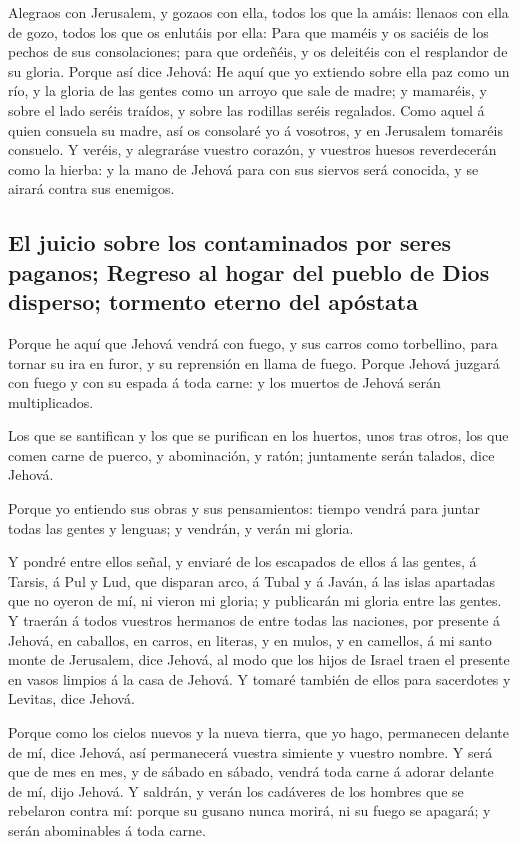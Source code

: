  Alegraos con Jerusalem, y gozaos con ella, todos los que
la amáis: llenaos con ella de gozo, todos los que os enlutáis por ella:
 Para que maméis y os saciéis de los pechos de sus
consolaciones; para que ordeñéis, y os deleitéis con el resplandor de su
gloria.  Porque así dice Jehová: He aquí que yo extiendo
sobre ella paz como un río, y la gloria de las gentes como un arroyo que
sale de madre; y mamaréis, y sobre el lado seréis traídos, y sobre las
rodillas seréis regalados.  Como aquel á quien consuela
su madre, así os consolaré yo á vosotros, y en Jerusalem tomaréis
consuelo.  Y veréis, y alegraráse vuestro corazón, y
vuestros huesos reverdecerán como la hierba: y la mano de Jehová para
con sus siervos será conocida, y se airará contra sus enemigos.

\hypertarget{el-juicio-sobre-los-contaminados-por-seres-paganos-regreso-al-hogar-del-pueblo-de-dios-disperso-tormento-eterno-del-apuxf3stata}{%
\subsection{El juicio sobre los contaminados por seres paganos; Regreso
al hogar del pueblo de Dios disperso; tormento eterno del
apóstata}\label{el-juicio-sobre-los-contaminados-por-seres-paganos-regreso-al-hogar-del-pueblo-de-dios-disperso-tormento-eterno-del-apuxf3stata}}

 Porque he aquí que Jehová vendrá con fuego, y sus carros
como torbellino, para tornar su ira en furor, y su reprensión en llama
de fuego.  Porque Jehová juzgará con fuego y con su
espada á toda carne: y los muertos de Jehová serán multiplicados.

 Los que se santifican y los que se purifican en los
huertos, unos tras otros, los que comen carne de puerco, y abominación,
y ratón; juntamente serán talados, dice Jehová.

 Porque yo entiendo sus obras y sus pensamientos: tiempo
vendrá para juntar todas las gentes y lenguas; y vendrán, y verán mi
gloria.

 Y pondré entre ellos señal, y enviaré de los escapados
de ellos á las gentes, á Tarsis, á Pul y Lud, que disparan arco, á Tubal
y á Javán, á las islas apartadas que no oyeron de mí, ni vieron mi
gloria; y publicarán mi gloria entre las gentes.  Y
traerán á todos vuestros hermanos de entre todas las naciones, por
presente á Jehová, en caballos, en carros, en literas, y en mulos, y en
camellos, á mi santo monte de Jerusalem, dice Jehová, al modo que los
hijos de Israel traen el presente en vasos limpios á la casa de Jehová.
 Y tomaré también de ellos para sacerdotes y Levitas,
dice Jehová.

 Porque como los cielos nuevos y la nueva tierra, que yo
hago, permanecen delante de mí, dice Jehová, así permanecerá vuestra
simiente y vuestro nombre.  Y será que de mes en mes, y
de sábado en sábado, vendrá toda carne á adorar delante de mí, dijo
Jehová.  Y saldrán, y verán los cadáveres de los hombres
que se rebelaron contra mí: porque su gusano nunca morirá, ni su fuego
se apagará; y serán abominables á toda carne.
